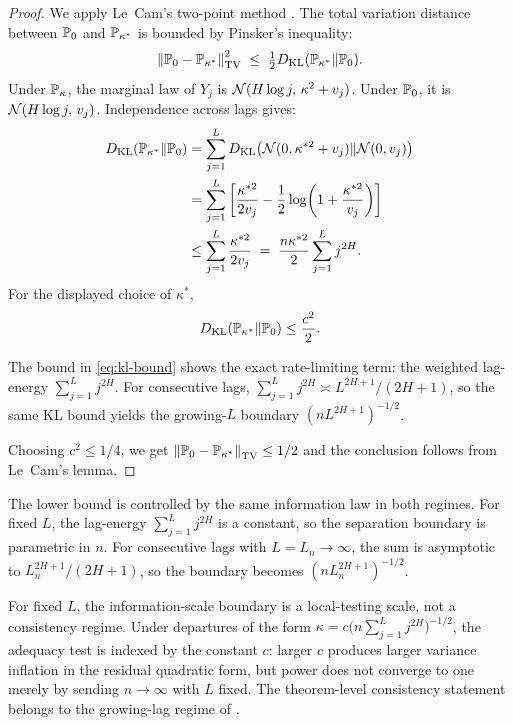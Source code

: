 \begin{proof}
We apply Le~Cam's two-point method \citep{lecam1973convergence}.
The total variation distance between $\mathbb{P}_0$ and $\mathbb{P}_{\kappa^*}$ is
bounded by Pinsker's inequality:
\[
    \left\|\mathbb{P}_0 - \mathbb{P}_{\kappa^*}\right\|_{\mathrm{TV}}^2
    \;\leq\; \tfrac{1}{2} D_{\mathrm{KL}}(\mathbb{P}_{\kappa^*} \| \mathbb{P}_0).
\]
Under $\mathbb{P}_\kappa$, the marginal law of $Y_j$ is
$\mathcal{N}(H\log j,\, \kappa^2 + v_j)$.  Under $\mathbb{P}_0$, it is
$\mathcal{N}(H\log j,\, v_j)$.  Independence across lags gives:
\begin{align}
    D_{\mathrm{KL}}(\mathbb{P}_{\kappa^*} \| \mathbb{P}_0)
    &= \sum_{j=1}^L D_{\mathrm{KL}}\!\left(\mathcal{N}(0,\kappa^{*2}+v_j)\|\mathcal{N}(0,v_j)\right)
    \notag\\
    &= \sum_{j=1}^L \left[\frac{\kappa^{*2}}{2v_j} -
       \frac{1}{2}\log\!\left(1+\frac{\kappa^{*2}}{v_j}\right)\right]
     \notag\\
    &\leq \sum_{j=1}^L \frac{\kappa^{*2}}{2 v_j}
    \;=\; \frac{n\kappa^{*2}}{2} \sum_{j=1}^L j^{2H}.
    \label{eq:kl-bound}
\end{align}
For the displayed choice of $\kappa^*$,
\[
    D_{\mathrm{KL}}(\mathbb{P}_{\kappa^*}\|\mathbb{P}_0)
    \leq \frac{c^2}{2}.
\]

\begin{remark}
    The bound in \eqref{eq:kl-bound} shows the exact rate-limiting term:
    the weighted lag-energy $\sum_{j=1}^L j^{2H}$.  For consecutive lags,
    $\sum_{j=1}^L j^{2H} \asymp L^{2H+1}/(2H+1)$, so the same KL bound yields
    the growing-$L$ boundary $(nL^{2H+1})^{-1/2}$.
\end{remark}

Choosing $c^2 \leq 1/4$, we get
$\left\|\mathbb{P}_0 - \mathbb{P}_{\kappa^*}\right\|_{\mathrm{TV}} \leq 1/2$
and the conclusion follows from Le~Cam's lemma.
\end{proof}

\begin{remark}
    The lower bound is controlled by the same information law in both regimes.
    For fixed $L$, the lag-energy $\sum_{j=1}^L j^{2H}$ is a constant, so the
    separation boundary is parametric in $n$.  For consecutive lags with
    $L=L_n \to \infty$, the sum is asymptotic to $L_n^{2H+1}/(2H+1)$, so the
    boundary becomes $(nL_n^{2H+1})^{-1/2}$.
\end{remark}

\begin{remark}
    For fixed $L$, the information-scale boundary is a local-testing scale, not
    a consistency regime.  Under departures of the form
    $\kappa = c\bigl(n\sum_{j=1}^L j^{2H}\bigr)^{-1/2}$, the adequacy test is
    indexed by the constant $c$: larger $c$ produces larger variance inflation
    in the residual quadratic form, but power does not converge to one merely by
    sending $n \to \infty$ with $L$ fixed.  The theorem-level consistency
    statement belongs to the growing-lag regime of .
\end{remark}
